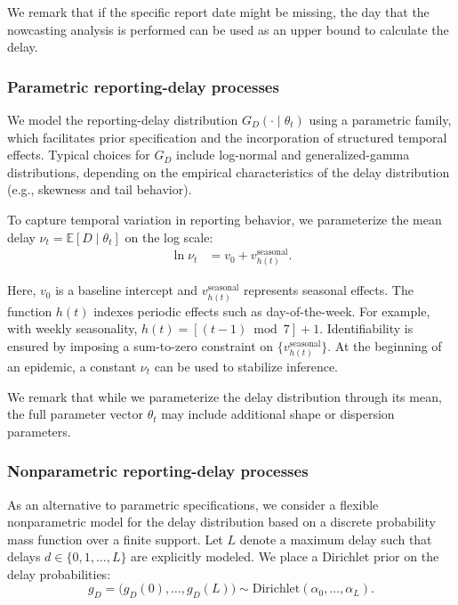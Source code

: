 \documentclass[12pt]{article}
\begin{document}
We remark that if the specific report date might be missing, the day that the nowcasting analysis is performed can be used as an upper bound to calculate the delay. 

\subsubsection{Parametric reporting-delay processes}

We model the reporting-delay distribution $G_D(\cdot \mid \theta_t)$ using a parametric family, which facilitates prior specification and the incorporation of structured temporal effects. Typical choices for $G_D$ include log-normal and generalized-gamma distributions, depending on the empirical characteristics of the delay distribution (e.g., skewness and tail behavior).

To capture temporal variation in reporting behavior, we parameterize the mean delay $\nu_t = \mathbb{E}[D \mid \theta_t]$ on the log scale:
\begin{equation}
\begin{aligned}
    \ln \nu_t &= v_0 + v^{\text{seasonal}}_{h(t)}.    
\end{aligned}
\end{equation}

Here, $v_0$ is a baseline intercept and $v_{h(t)}^{\text{seasonal}}$ represents seasonal effects. The function $h(t)$ indexes periodic effects such as day-of-the-week. For example, with weekly seasonality, $h(t) = \left[(t - 1) \bmod 7 \right] + 1$. Identifiability is ensured by imposing a sum-to-zero constraint on $\{v_{h(t)}^{\text{seasonal}}\}$. At the beginning of an epidemic, a constant $\nu_t$ can be used to stabilize inference.

We remark that while we parameterize the delay distribution through its mean, the full parameter vector $\theta_t$ may include additional shape or dispersion parameters.


\subsubsection{Nonparametric reporting-delay processes}

As an alternative to parametric specifications, we consider a flexible nonparametric model for the delay distribution based on a discrete probability mass function over a finite support. Let $L$ denote a maximum delay such that delays $d \in \{0,1,\dots,L\}$ are explicitly modeled. We place a Dirichlet prior on the delay probabilities:
\begin{equation}
    g_D = \big(g_D(0), \dots, g_D(L)\big) \sim \text{Dirichlet}(\alpha_0, \dots, \alpha_L).
\end{equation}
\end{document}
